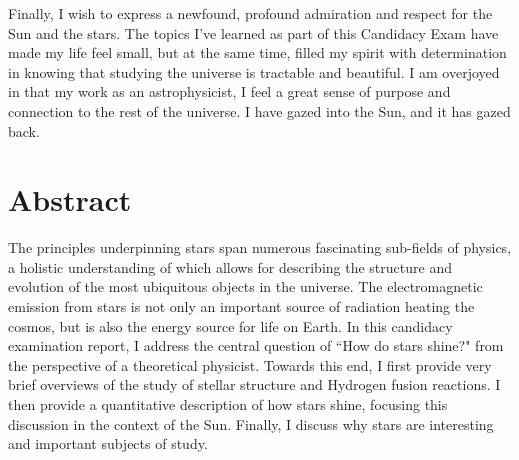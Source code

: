 \documentclass[12pt]{article}
\begin{document}
Finally, I wish to express a newfound, profound admiration and respect for the Sun and the stars. The topics I've learned as part of this Candidacy Exam have made my life feel small, but at the same time, filled my spirit with determination in knowing that studying the universe is tractable and beautiful. I am overjoyed in that my work as an astrophysicist, I feel a great sense of purpose and connection to the rest of the universe. I have gazed into the Sun, and it has gazed back.
\pagebreak
\section*{Abstract}
The principles underpinning stars span numerous fascinating sub-fields of physics, a holistic understanding of which allows for describing the structure and evolution of the most ubiquitous objects in the universe. The electromagnetic emission from stars is not only an important source of radiation heating the cosmos, but is also the energy source for life on Earth. In this candidacy examination report, I address the central question of ``How do stars shine?" from the perspective of a theoretical physicist. Towards this end, I first provide very brief overviews of the study of stellar structure and Hydrogen fusion reactions. I then provide a quantitative description of how stars shine, focusing this discussion in the context of the Sun. Finally, I discuss why stars are interesting and important subjects of study.
\pagebreak


\tableofcontents


\pagebreak


\doublespacing
{}
\end{document}
